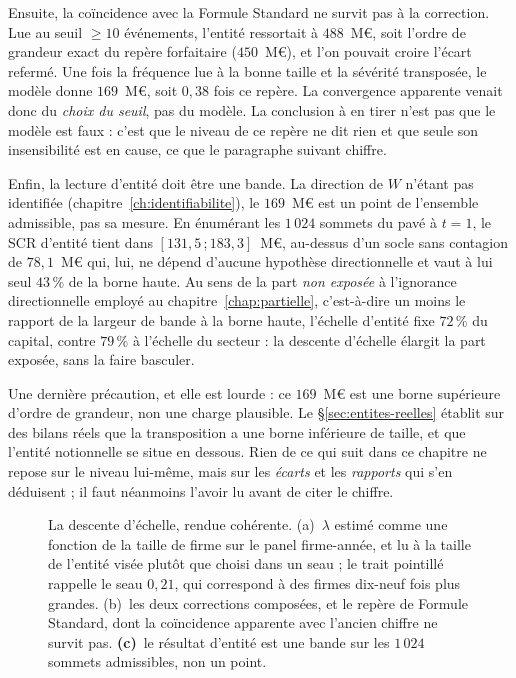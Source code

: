 Ensuite, la coïncidence avec la Formule Standard
ne survit pas à la correction. Lue au seuil \og{}$\geq 10$ événements\fg{}, l'entité ressortait
à $488$~M\euro, soit l'ordre de grandeur exact du repère forfaitaire ($450$~M\euro), et
l'on pouvait croire l'écart refermé. Une fois la fréquence lue à la bonne taille et la
sévérité transposée, le modèle donne $169$~M\euro, soit $0{,}38$ fois ce repère. La
convergence apparente venait donc du \emph{choix du seuil}, pas du modèle. La conclusion à en
tirer n'est pas que le modèle est faux : c'est que le niveau de ce repère ne dit rien
et que seule son insensibilité est en cause, ce que le paragraphe suivant chiffre.

Enfin, la lecture d'entité doit être une bande. La direction de $W$ n'étant pas
identifiée (chapitre~\ref{ch:identifiabilite}), le $169$~M\euro{} est un point de l'ensemble
admissible, pas sa mesure. En énumérant les $1\,024$ sommets du pavé à $t=1$, le SCR d'entité
tient dans $[131{,}5\,;183{,}3]$~M\euro{}, au-dessus d'un socle sans contagion de
$78{,}1$~M\euro{} qui, lui, ne dépend d'aucune hypothèse directionnelle et vaut à lui seul
$43\,\%$ de la borne haute. Au sens de la part \emph{non exposée} à l'ignorance
directionnelle employé au chapitre~\ref{chap:partielle}, c'est-à-dire un moins le rapport de
la largeur de bande à la borne haute, l'échelle d'entité fixe $72\,\%$ du capital, contre
$79\,\%$ à l'échelle du secteur : la descente d'échelle élargit la part exposée, sans la
faire basculer.

Une dernière précaution, et elle est lourde : ce $169$~M\euro{} est une borne supérieure
d'ordre de grandeur, non une charge plausible. Le \S\ref{sec:entites-reelles} établit sur des
bilans réels que la transposition a une borne inférieure de taille, et que l'entité notionnelle
se situe en dessous. Rien de ce qui suit dans ce chapitre ne repose sur le niveau lui-même, mais
sur les \emph{écarts} et les \emph{rapports} qui s'en déduisent ; il faut néanmoins l'avoir lu
avant de citer le chiffre.

\begin{figure}[htbp]\centering
{}
\caption{La descente d'échelle, rendue cohérente. (a)~$\lambda$ estimé comme une
fonction de la taille de firme sur le panel firme-année, et lu à la taille de l'entité visée
plutôt que choisi dans un seau ; le trait pointillé rappelle le seau $0{,}21$, qui correspond
à des firmes dix-neuf fois plus grandes. (b)~les deux corrections composées, et le
repère de Formule Standard, dont la coïncidence apparente avec l'ancien chiffre ne survit pas.
\textbf{(c)}~le résultat d'entité est une bande sur les $1\,024$ sommets admissibles, non un
point.}
\label{fig:descente}
\end{figure}

